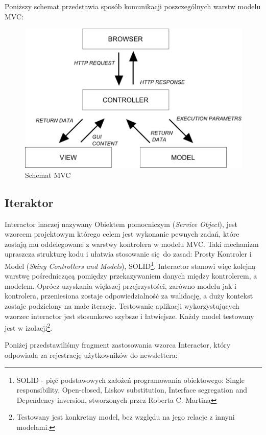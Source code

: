     Poniższy schemat przedstawia sposób komunikacji poszczególnych warstw modelu MVC:
    \begin{figure}[h]
      \centering
      \includegraphics[scale=0.87]{images/mvc_model.png}
      \caption{Schemat MVC}
    \end{figure}
  \subsection{Iteraktor}
  Interactor\cite{interactors} inaczej nazywany Obiektem pomocniczym (\emph{Service Object}), jest wzorcem projektowym którego celem jest
  wykonanie pewnych zadań, które zostają mu oddelegowane z warstwy kontrolera w modelu MVC. Taki mechanizm upraszcza strukturę kodu i ułatwia stosowanie się do zasad: Prosty Kontroler i Model (\emph{Skiny Controllers and Models}), SOLID\footnote{SOLID - pięć podstawowych założeń programowania obiektowego: Single responsibility, Open-closed, Liskov substitution, Interface segregation and Dependency inversion,  stworzonych przez Roberta C. Martina}.
  Interactor stanowi więc kolejną warstwę pośredniczącą pomiędzy przekazywaniem danych między kontrolerem, a modelem. Oprócz uzyskania większej przejrzystości, zarówno modelu jak i kontrolera, przeniesiona zostaje odpowiedzialność za walidację, a duży kontekst zostaje podzielony na małe iteracje. Testowanie aplikacji wykorzystujących wzorzec interactor jest stosunkowo szybsze i łatwiejsze. Każdy model testowany jest w izolacji\footnote{Testowany jest konkretny model, bez względu na jego relacje z innyni modelami.}.

  Poniżej przedstawiliśmy fragment zastosowania wzorca Interactor, który odpowiada za rejestrację użytkowników do newslettera:\\
  
